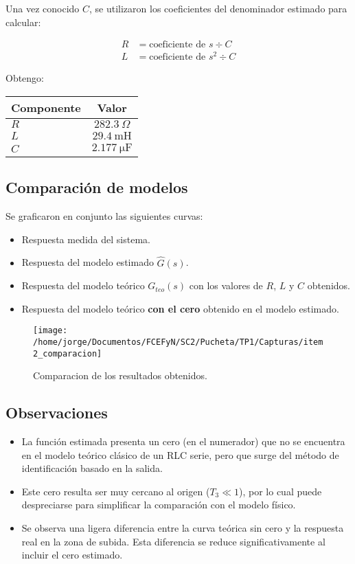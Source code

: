 \documentclass{article}
\begin{document}
Una vez conocido $C$, se utilizaron los coeficientes del denominador estimado para calcular:

\begin{align}
R &= \text{coeficiente de } s \div C \\
L &= \text{coeficiente de } s^2 \div C
\end{align}

Obtengo:
\begin{center}
\begin{tabular}{lc}
\hline
Componente & Valor \\
\hline
\(R\) & \(282.3\ \Omega\) \\
\(L\) & \(29.4 \ \mathrm{mH}\) \\
\(C\) & \(2.177 \ \mathrm{\mu F}\) \\
\hline
\end{tabular}
\end{center}
\subsection*{Comparación de modelos}
Se graficaron en conjunto las siguientes curvas:
\begin{itemize}
    \item Respuesta medida del sistema.
    \item Respuesta del modelo estimado $\hat{G}(s)$.
    \item Respuesta del modelo teórico $G_{teo}(s)$ con los valores de $R$, $L$ y $C$ obtenidos.
    \item Respuesta del modelo teórico \textbf{con el cero} obtenido en el modelo estimado.
\end{itemize}

\begin{figure}[ht!]
      \centering
        \texttt{[image: /home/jorge/Documentos/FCEFyN/SC2/Pucheta/TP1/Capturas/item2\_comparacion]}
          \caption{Comparacion de los resultados obtenidos.}
            \label{fig:etiqueta3}
        \end{figure} 

\subsection*{Observaciones}
\begin{itemize}
    \item La función estimada presenta un cero (en el numerador) que no se encuentra en el modelo teórico clásico de un RLC serie, pero que surge del método de identificación basado en la salida.
    \item Este cero resulta ser muy cercano al origen ($T_3 \ll 1$), por lo cual puede despreciarse para simplificar la comparación con el modelo físico.
    \item Se observa una ligera diferencia entre la curva teórica sin cero y la respuesta real en la zona de subida. Esta diferencia se reduce significativamente al incluir el cero estimado.
\end{itemize}
\end{document}

